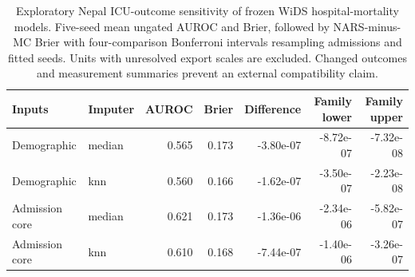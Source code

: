 \begin{table}[t]
\centering\scriptsize
\caption{Exploratory Nepal ICU-outcome sensitivity of frozen WiDS hospital-mortality models. Five-seed mean ungated AUROC and Brier, followed by NARS-minus-MC Brier with four-comparison Bonferroni intervals resampling admissions and fitted seeds. Units with unresolved export scales are excluded. Changed outcomes and measurement summaries prevent an external compatibility claim.}
\label{tab:nepal}
\setlength{\tabcolsep}{3pt}
\begin{tabular}{@{}llrrrrr@{}}
\toprule
Inputs & Imputer & AUROC & Brier & Difference & Family lower & Family upper \\
\midrule
Demographic & median & 0.565 & 0.173 & -3.80e-07 & -8.72e-07 & -7.32e-08 \\
Demographic & knn & 0.560 & 0.166 & -1.62e-07 & -3.50e-07 & -2.23e-08 \\
Admission core & median & 0.621 & 0.173 & -1.36e-06 & -2.34e-06 & -5.82e-07 \\
Admission core & knn & 0.610 & 0.168 & -7.44e-07 & -1.40e-06 & -3.26e-07 \\
\bottomrule
\end{tabular}
\end{table}

